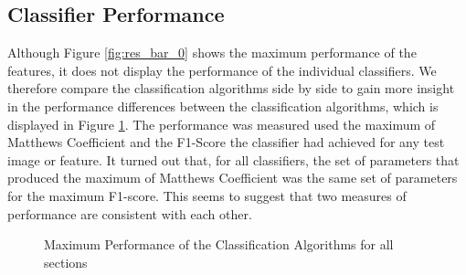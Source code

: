 
\subsection{Classifier Performance}

Although Figure \ref{fig:res_bar_0} shows the maximum performance of the features, it does not display the performance of the individual classifiers. We therefore compare the classification algorithms side by side to gain more insight in the performance differences between the classification algorithms, which is displayed in Figure \ref{fig:res_bar_1}. The performance was measured used the maximum of Matthews Coefficient and the F1-Score the classifier had achieved for any test image or feature. It turned out that, for all classifiers, the set of parameters that produced the maximum of Matthews Coefficient was the same set of parameters for the maximum F1-score. This seems to suggest that two measures of performance are consistent with each other.


\dataone

\begin{figure}
	\caption{Maximum Performance of the Classification Algorithms for all sections}
	\label{fig:res_bar_1}
\end{figure}



